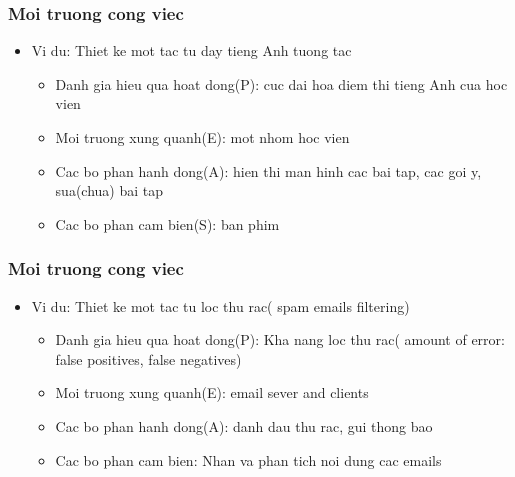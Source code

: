 \documentclass[12pt]{beamer}
\begin{document}
\begin{frame}
\frametitle{Moi truong cong viec}
\begin{itemize}
    \item Vi du: Thiet ke mot tac tu day tieng Anh tuong tac\\
    \begin{itemize}
        \item Danh gia hieu qua hoat dong(P): cuc dai hoa diem thi tieng Anh cua hoc vien\\
        \item Moi truong xung quanh(E): mot nhom hoc vien\\
        \item Cac bo phan hanh dong(A): hien thi man hinh cac bai tap, cac goi y, sua(chua) bai tap\\
        \item Cac bo phan cam bien(S): ban phim\\
    \end{itemize}
\end{itemize}
\end{frame}
\begin{frame}
\frametitle{Moi truong cong viec}
\begin{itemize}
    \item Vi du: Thiet ke mot tac tu loc thu rac( spam emails filtering)\\
    \begin{itemize}
        \item Danh gia hieu qua hoat dong(P): Kha nang loc thu rac( amount of error: false positives, false negatives)\\
        \item Moi truong xung quanh(E): email sever and clients\\
        \item Cac bo phan hanh dong(A): danh dau thu rac, gui thong bao\\
        \item Cac bo phan cam bien: Nhan va phan tich noi dung cac emails\\
    \end{itemize}
\end{itemize}
\end{frame}
\end{document}
